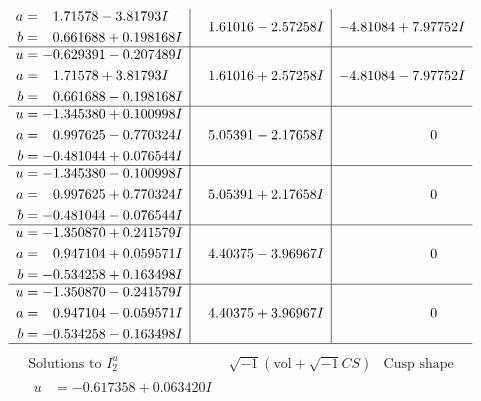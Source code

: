 \documentclass[1p]{elsarticle_modified}
\theoremstyle{definition}
\newcommand{\I}{\sqrt{-1}}
\begin{document}
$$\begin{array}{c|c|c}
\begin{aligned}
a &= \phantom{-}1.71578 - 3.81793 I \\
b &= \phantom{-}0.661688 + 0.198168 I\end{aligned}
 & \phantom{-}1.61016 - 2.57258 I & -4.81084 + 7.97752 I \\ \hline\begin{aligned}
u &= -0.629391 - 0.207489 I \\
a &= \phantom{-}1.71578 + 3.81793 I \\
b &= \phantom{-}0.661688 - 0.198168 I\end{aligned}
 & \phantom{-}1.61016 + 2.57258 I & -4.81084 - 7.97752 I \\ \hline\begin{aligned}
u &= -1.345380 + 0.100998 I \\
a &= \phantom{-}0.997625 - 0.770324 I \\
b &= -0.481044 + 0.076544 I\end{aligned}
 & \phantom{-}5.05391 - 2.17658 I & \phantom{-0.000000 } 0 \\ \hline\begin{aligned}
u &= -1.345380 - 0.100998 I \\
a &= \phantom{-}0.997625 + 0.770324 I \\
b &= -0.481044 - 0.076544 I\end{aligned}
 & \phantom{-}5.05391 + 2.17658 I & \phantom{-0.000000 } 0 \\ \hline\begin{aligned}
u &= -1.350870 + 0.241579 I \\
a &= \phantom{-}0.947104 + 0.059571 I \\
b &= -0.534258 + 0.163498 I\end{aligned}
 & \phantom{-}4.40375 - 3.96967 I & \phantom{-0.000000 } 0 \\ \hline\begin{aligned}
u &= -1.350870 - 0.241579 I \\
a &= \phantom{-}0.947104 - 0.059571 I \\
b &= -0.534258 - 0.163498 I\end{aligned}
 & \phantom{-}4.40375 + 3.96967 I & \phantom{-0.000000 } 0\\
 \hline 
 \end{array}$$\newpage$$\begin{array}{c|c|c}  
\text{Solutions to }I^u_{2}& \I (\text{vol} + \sqrt{-1}CS) & \text{Cusp shape}\\
 \hline 
\begin{aligned}
u &= -0.617358 + 0.063420 I \\

\end{aligned}
\end{array}$$
\end{document}
